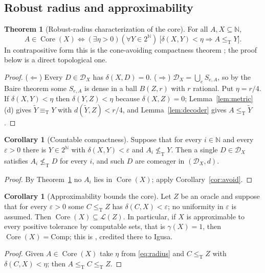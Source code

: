 \documentclass[11pt,letterpaper]{article}
\theoremstyle{definition}
\newtheorem{theorem}[definition]{Theorem}
\newtheorem{corollary}[definition]{Corollary}
\numberwithin{equation}{section}
\newcommand{\N}{\mathbb N}
\newcommand{\Cantor}{2^{\N}}
\newcommand{\leT}{\le_{\mathrm T}}
\newcommand{\eqT}{\equiv_{\mathrm T}}
\newcommand{\nleT}{\nleq_{\mathrm T}}
\newcommand{\DX}[1]{\mathcal D_{#1}}
\newcommand{\Low}{\mathcal L}
\newcommand{\Core}{\operatorname{Core}}
\newcommand{\Comp}{\mathrm{Comp}}
\newcommand{\src}[1]{\leavevmode{\sffamily\footnotesize\color{Steel}[#1]}}
\begin{document}
\subsection{Robust radius and approximability}
\begin{theorem}[Robust-radius characterization of the core]\label{thm:radius}\src{R1, R8}
For all $A,X\subseteq\N$,
\begin{equation}\label{eq:radius}
 A\in\Core(X)\iff(\exists\eta>0)(\forall Y\in\Cantor)\ \bigl[\delta(X,Y)<\eta\Rightarrow A\leT Y\bigr].
\end{equation}
In contrapositive form this is the cone-avoiding compactness theorem \cite[Theorem~3.7]{HJKS}; the proof below is a direct topological one.
\end{theorem}
\begin{proof}
($\Leftarrow$) Every $D\in\DX X$ has $\delta(X,D)=0$. ($\Rightarrow$) $\DX X=\bigcup_eS_{e,A}$, so by the Baire theorem some $S_{e,A}$ is dense in a ball $B(Z,r)$ with $r$ rational. Put $\eta=r/4$. If $\delta(X,Y)<\eta$ then $\delta(Y,Z)<\eta$ because $\delta(X,Z)=0$; Lemma~\ref{lem:metric}(d) gives $\widetilde Y\eqT Y$ with $d(\widetilde Y,Z)<r/4$, and Lemma~\ref{lem:decoder} gives $A\leT\widetilde Y$.
\end{proof}

\begin{corollary}[Countable compactness]\label{cor:countablecompact}\src{R1}
Suppose that for every $i\in\N$ and every $\varepsilon>0$ there is $Y\in\Cantor$ with $\delta(X,Y)<\varepsilon$ and $A_i\nleT Y$. Then a single $D\in\DX X$ satisfies $A_i\nleT D$ for every $i$, and such $D$ are comeager in $(\DX X,d)$.
\end{corollary}
\begin{proof}
By Theorem~\ref{thm:radius} no $A_i$ lies in $\Core(X)$; apply Corollary~\ref{cor:avoid}.
\end{proof}

\begin{corollary}[Approximability bounds the core]\label{cor:approx}\src{R8, R9}
Let $Z$ be an oracle and suppose that for every $\varepsilon>0$ some $C\leT Z$ has $\delta(C,X)<\varepsilon$; no uniformity in $\varepsilon$ is assumed. Then $\Core(X)\subseteq\Low(Z)$. In particular, if $X$ is approximable to every positive tolerance by computable sets, that is $\gamma(X)=1$, then $\Core(X)=\Comp$; this is \cite[Theorem~4.3]{HJKS}, credited there to Igusa.\end{corollary}
\begin{proof}
Given $A\in\Core(X)$ take $\eta$ from \eqref{eq:radius} and $C\leT Z$ with $\delta(C,X)<\eta$; then $A\leT C\leT Z$.
\end{proof}
\end{document}
